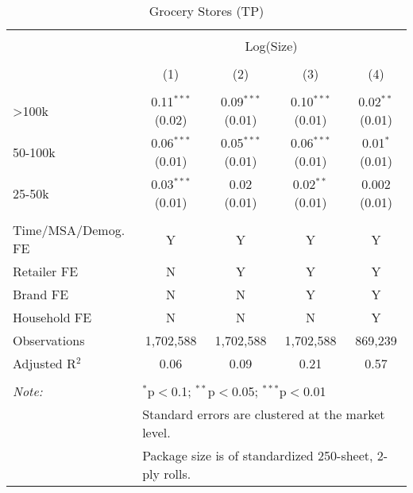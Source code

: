 
\begin{table}[!htbp] \centering 
  \caption{Grocery Stores (TP)} 
  \label{tab:packageSizeGrocery} 
\begin{tabular}{@{\extracolsep{5pt}}lcccc} 
\\[-1.8ex]\hline 
\hline \\[-1.8ex] 
 & \multicolumn{4}{c}{Log(Size)} \\ 
\\[-1.8ex] & (1) & (2) & (3) & (4)\\ 
\hline \\[-1.8ex] 
 >100k & 0.11$^{***}$ (0.02) & 0.09$^{***}$ (0.01) & 0.10$^{***}$ (0.01) & 0.02$^{**}$ (0.01) \\ 
  50-100k & 0.06$^{***}$ (0.01) & 0.05$^{***}$ (0.01) & 0.06$^{***}$ (0.01) & 0.01$^{*}$ (0.01) \\ 
  25-50k & 0.03$^{***}$ (0.01) & 0.02 (0.01) & 0.02$^{**}$ (0.01) & 0.002 (0.01) \\ 
 \hline \\[-1.8ex] 
Time/MSA/Demog. FE & Y & Y & Y & Y \\ 
Retailer FE & N & Y & Y & Y \\ 
Brand FE & N & N & Y & Y \\ 
Household FE & N & N & N & Y \\ 
Observations & 1,702,588 & 1,702,588 & 1,702,588 & 869,239 \\ 
Adjusted R$^{2}$ & 0.06 & 0.09 & 0.21 & 0.57 \\ 
\hline 
\hline \\[-1.8ex] 
\textit{Note:}  & \multicolumn{4}{l}{$^{*}$p$<$0.1; $^{**}$p$<$0.05; $^{***}$p$<$0.01} \\ 
 & \multicolumn{4}{l}{Standard errors are clustered at the market level.} \\ 
 & \multicolumn{4}{l}{Package size is of standardized 250-sheet, 2-ply rolls.} \\ 
\end{tabular} 
\end{table} 
